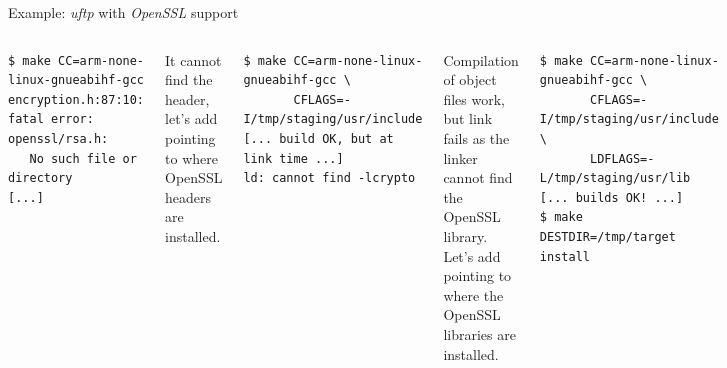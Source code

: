 \begin{frame}[fragile]{Example: {\em uftp} with {\em OpenSSL} support}
  \begin{columns}
  \begin{block}{}
    {\tiny
\begin{verbatim}
$ make CC=arm-none-linux-gnueabihf-gcc
encryption.h:87:10: fatal error: openssl/rsa.h:
   No such file or directory
[...]
\end{verbatim}
    }
  \end{block}

  {\small It cannot find the header, let's add  pointing
    to where OpenSSL headers are installed.}

  \begin{block}{}
    {\tiny
\begin{verbatim}
$ make CC=arm-none-linux-gnueabihf-gcc \
       CFLAGS=-I/tmp/staging/usr/include
[... build OK, but at link time ...]
ld: cannot find -lcrypto
\end{verbatim}
    }
  \end{block}

  {\small Compilation of object files work, but link fails as the
    linker cannot find the OpenSSL library. Let's add 
    pointing to where the OpenSSL libraries are installed.}


  \begin{block}{}
    {\tiny
\begin{verbatim}
$ make CC=arm-none-linux-gnueabihf-gcc \
       CFLAGS=-I/tmp/staging/usr/include \
       LDFLAGS=-L/tmp/staging/usr/lib
[... builds OK! ...]
$ make DESTDIR=/tmp/target install
\end{verbatim}
    }
  \end{block}

  {\small Now it builds and installs fine!}

  \begin{block}{}
    {\tiny
\begin{verbatim}
$ arm-none-linux-gnueabihf-readelf -d /tmp/target/usr/bin/uftp
[...]
 0x00000001 (NEEDED) Shared library: [libm.so.6]
 0x00000001 (NEEDED) Shared library: [libcrypto.so.1.1]
 0x00000001 (NEEDED) Shared library: [libpthread.so.0]
 0x00000001 (NEEDED) Shared library: [libc.so.6]
[...]
\end{verbatim}
    }
  \end{block}

  {\small We can indeed see that  is linked against the
     shared library.}

\end{columns}
\end{frame}

